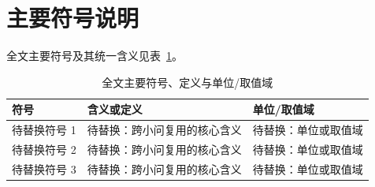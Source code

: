 
\section{主要符号说明}
全文主要符号及其统一含义见表~\ref{tab:main-symbols}。

\begin{table}[htbp]
  \centering
  \caption{全文主要符号、定义与单位/取值域}
  \label{tab:main-symbols}
  \begin{tabularx}{\textwidth}{>{\centering\arraybackslash}p{}X>{\centering\arraybackslash}p{}}
    \toprule
    符号 & 含义或定义 & 单位/取值域 \\
    \midrule
    待替换符号 1 & 待替换：跨小问复用的核心含义 & 待替换：单位或取值域 \\
    待替换符号 2 & 待替换：跨小问复用的核心含义 & 待替换：单位或取值域 \\
    待替换符号 3 & 待替换：跨小问复用的核心含义 & 待替换：单位或取值域 \\
    \bottomrule
  \end{tabularx}
\end{table}

